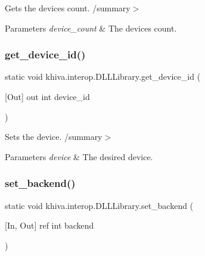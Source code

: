 Gets the devices count. /summary$>$ 
\begin{DoxyParams}{Parameters}
{\em device\+\_\+count} & The devices count.\\
\hline
\end{DoxyParams}


\mbox{\label{classkhiva_1_1interop_1_1_d_l_l_library_ac02fd5c68ca77e632601922dad9ba635}} 
\subsubsection{\texorpdfstring{get\+\_\+device\+\_\+id()}{get\_device\_id()}}
{\footnotesize\ttfamily static void khiva.\+interop.\+D\+L\+L\+Library.\+get\+\_\+device\+\_\+id (\begin{DoxyParamCaption}\item[{\mbox{[}\+Out\mbox{]} out int}]{device\+\_\+id }\end{DoxyParamCaption})\hspace{0.3cm}{\ttfamily [static]}}



Sets the device. /summary$>$ 
\begin{DoxyParams}{Parameters}
{\em device} & The desired device.\\
\hline
\end{DoxyParams}


\mbox{\label{classkhiva_1_1interop_1_1_d_l_l_library_ad74860666bd91cc93b07f5b5d8d24984}} 
\subsubsection{\texorpdfstring{set\+\_\+backend()}{set\_backend()}}
{\footnotesize\ttfamily static void khiva.\+interop.\+D\+L\+L\+Library.\+set\+\_\+backend (\begin{DoxyParamCaption}\item[{\mbox{[}\+In, Out\mbox{]} ref int}]{backend }\end{DoxyParamCaption})\hspace{0.3cm}{\ttfamily [static]}}



